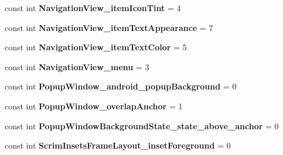 \begin{DoxyCompactItemize}
\item 
\hypertarget{classClient_1_1Droid_1_1Resource_1_1Styleable_add2033dddd29006e59c0d0ee88282259}{}const int {\bfseries Navigation\+View\+\_\+item\+Icon\+Tint} = 4\label{classClient_1_1Droid_1_1Resource_1_1Styleable_add2033dddd29006e59c0d0ee88282259}

\item 
\hypertarget{classClient_1_1Droid_1_1Resource_1_1Styleable_a7befa582882a6ff19ae94f3d26211d4f}{}const int {\bfseries Navigation\+View\+\_\+item\+Text\+Appearance} = 7\label{classClient_1_1Droid_1_1Resource_1_1Styleable_a7befa582882a6ff19ae94f3d26211d4f}

\item 
\hypertarget{classClient_1_1Droid_1_1Resource_1_1Styleable_aede21268881c55bcfd9f7efdace131d7}{}const int {\bfseries Navigation\+View\+\_\+item\+Text\+Color} = 5\label{classClient_1_1Droid_1_1Resource_1_1Styleable_aede21268881c55bcfd9f7efdace131d7}

\item 
\hypertarget{classClient_1_1Droid_1_1Resource_1_1Styleable_a9f74a6e29e3d109644448f49007394a6}{}const int {\bfseries Navigation\+View\+\_\+menu} = 3\label{classClient_1_1Droid_1_1Resource_1_1Styleable_a9f74a6e29e3d109644448f49007394a6}

\item 
\hypertarget{classClient_1_1Droid_1_1Resource_1_1Styleable_a29c8e45692086510dbabe8983ee30b90}{}const int {\bfseries Popup\+Window\+\_\+android\+\_\+popup\+Background} = 0\label{classClient_1_1Droid_1_1Resource_1_1Styleable_a29c8e45692086510dbabe8983ee30b90}

\item 
\hypertarget{classClient_1_1Droid_1_1Resource_1_1Styleable_a54c4b702a0edb8eb336476875d461513}{}const int {\bfseries Popup\+Window\+\_\+overlap\+Anchor} = 1\label{classClient_1_1Droid_1_1Resource_1_1Styleable_a54c4b702a0edb8eb336476875d461513}

\item 
\hypertarget{classClient_1_1Droid_1_1Resource_1_1Styleable_a7d7bf11e7f945026ae64cc233926664d}{}const int {\bfseries Popup\+Window\+Background\+State\+\_\+state\+\_\+above\+\_\+anchor} = 0\label{classClient_1_1Droid_1_1Resource_1_1Styleable_a7d7bf11e7f945026ae64cc233926664d}

\item 
\hypertarget{classClient_1_1Droid_1_1Resource_1_1Styleable_a4ee8874b1a7e58508c35c4c70a389688}{}const int {\bfseries Scrim\+Insets\+Frame\+Layout\+\_\+inset\+Foreground} = 0\label{classClient_1_1Droid_1_1Resource_1_1Styleable_a4ee8874b1a7e58508c35c4c70a389688}


\end{DoxyCompactItemize}
